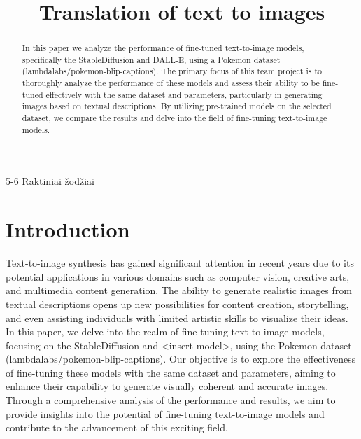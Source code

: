 \documentclass[conference]{IEEEtran}
\begin{document}
\title{Translation of text to images}
\author{
\and
{}
}
\maketitle

\begin{abstract}
In this paper we analyze the performance of fine-tuned text-to-image models, specifically the StableDiffusion and DALL-E, using a Pokemon dataset (lambdalabs/pokemon-blip-captions). The primary focus of this team project is to thoroughly analyze the performance of these models and assess their ability to be fine-tuned effectively with the same dataset and parameters, particularly in generating images based on textual descriptions. By utilizing pre-trained models on the selected dataset, we compare the results and delve into the field of fine-tuning text-to-image models.
\end{abstract}

\begin{IEEEkeywords}
5-6 Raktiniai žodžiai
\end{IEEEkeywords}

\section{Introduction}
Text-to-image synthesis has gained significant attention in recent years due to its potential applications in various domains such as computer vision, creative arts, and multimedia content generation. The ability to generate realistic images from textual descriptions opens up new possibilities for content creation, storytelling, and even assisting individuals with limited artistic skills to visualize their ideas. In this paper, we delve into the realm of fine-tuning text-to-image models, focusing on the StableDiffusion and <insert model>, using the Pokemon dataset (lambdalabs/pokemon-blip-captions). Our objective is to explore the effectiveness of fine-tuning these models with the same dataset and parameters, aiming to enhance their capability to generate visually coherent and accurate images. Through a comprehensive analysis of the performance and results, we aim to provide insights into the potential of fine-tuning text-to-image models and contribute to the advancement of this exciting field.
\end{document}
